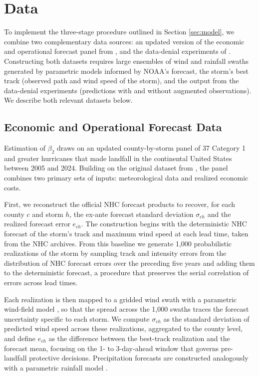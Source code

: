 \documentclass[12pt]{article}%
\begin{document}
\section{Data} \label{sec:data}

To implement the three-stage procedure outlined in Section \ref{sec:model}, we combine two complementary data sources: an updated version of the economic and operational forecast panel from \citet{molina2024social}, and the data-denial experiments of \citet{DitchekEA2023}. Constructing both datasets requires large ensembles of wind and rainfall swaths generated by parametric models informed by NOAA's forecast, the storm's best track (observed path and wind speed of the storm), and the output from the data-denial experiments (predictions with and without augmented observations). We describe both relevant datasets below.

\subsection{Economic and Operational Forecast Data}

Estimation of $\beta_{2}$ draws on an updated county-by-storm panel of 37 Category 1 and greater hurricanes that made landfall in the continental United States between 2005 and 2024. Building on the original dataset from \citet{molina2024social}, the panel combines two primary sets of inputs: meteorological data and realized economic costs.

First, we reconstruct the official NHC forecast products to recover, for each county $c$ and storm $h$, the ex-ante forecast standard deviation $\sigma_{ch}$ and the realized forecast error $e_{ch}$. The construction begins with the deterministic NHC forecast of the storm's track and maximum wind speed at each lead time, taken from the NHC archives. From this baseline we generate 1,000 probabilistic realizations of the storm by sampling track and intensity errors from the distribution of NHC forecast errors over the preceding five years and adding them to the deterministic forecast, a procedure that preserves the serial correlation of errors across lead times. 

Each realization is then mapped to a gridded wind swath with a parametric wind-field model \citep{willoughby2006parametric, knaff2007statistical}, so that the spread across the 1,000 swaths traces the forecast uncertainty specific to each storm. We compute $\sigma_{ch}$ as the standard deviation of predicted wind speed across these realizations, aggregated to the county level, and define $e_{ch}$ as the difference between the best-track realization and the forecast mean, focusing on the 1- to 3-day-ahead window that governs pre-landfall protective decisions. Precipitation forecasts are constructed analogously with a parametric rainfall model \citep{lonfat2007parametric}.  
\end{document}
